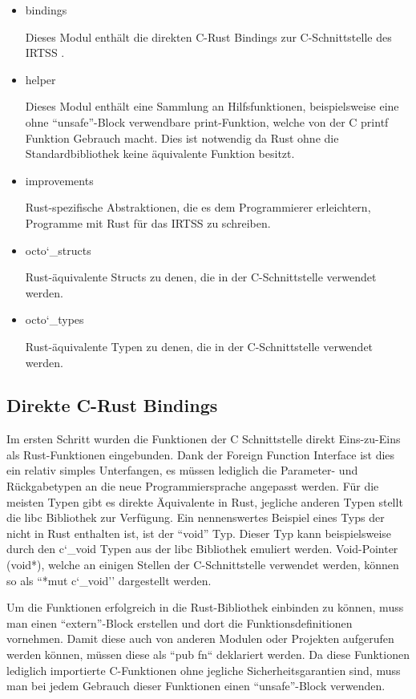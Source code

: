 \begin{itemize}

	\item{bindings}
	
	Dieses Modul enthält die direkten C-Rust Bindings zur C-Schnittstelle des IRTSS	.
	
	\item{helper}
	
	Dieses Modul enthält eine Sammlung an Hilfsfunktionen, beispielsweise eine ohne ``unsafe''-Block verwendbare
	print-Funktion, welche von der C printf Funktion Gebrauch macht. Dies ist notwendig da Rust ohne die Standardbibliothek
	keine äquivalente Funktion besitzt.
	
	\item{improvements}
	
	Rust-spezifische Abstraktionen, die es dem Programmierer erleichtern, Programme mit Rust für das IRTSS zu schreiben.
	
	\item{octo\char`_structs}
	
	Rust-äquivalente Structs zu denen, die in der C-Schnittstelle verwendet werden.
	
	\item{octo\char`_types}
	
	Rust-äquivalente Typen zu denen, die in der C-Schnittstelle verwendet werden.

\end{itemize}

\subsection{Direkte C-Rust Bindings}

Im ersten Schritt wurden die Funktionen der C Schnittstelle direkt Eins-zu-Eins als Rust-Funktionen eingebunden. Dank der
Foreign Function Interface ist dies ein relativ simples Unterfangen, es müssen lediglich die Parameter- und Rückgabetypen
an die neue Programmiersprache angepasst werden. Für die meisten Typen gibt es direkte Äquivalente in Rust, jegliche anderen Typen
stellt die libc Bibliothek zur Verfügung. Ein nennenswertes Beispiel eines Typs der nicht in Rust enthalten ist, ist der
``void'' Typ. Dieser Typ kann beispielsweise durch den c\char`_void Typen aus der libc Bibliothek emuliert werden.
Void-Pointer (void*), welche an einigen Stellen der C-Schnittstelle verwendet werden, können so als ``*mut c\char`_void''
dargestellt werden.

Um die Funktionen erfolgreich in die Rust-Bibliothek einbinden zu können, muss man einen ``extern''-Block erstellen und dort
die Funktionsdefinitionen vornehmen. Damit diese auch von anderen Modulen oder Projekten aufgerufen werden können, müssen diese
als ``pub fn`` deklariert werden. Da diese Funktionen lediglich importierte C-Funktionen ohne jegliche Sicherheitsgarantien
sind, muss man bei jedem Gebrauch dieser Funktionen einen ``unsafe''-Block verwenden.

